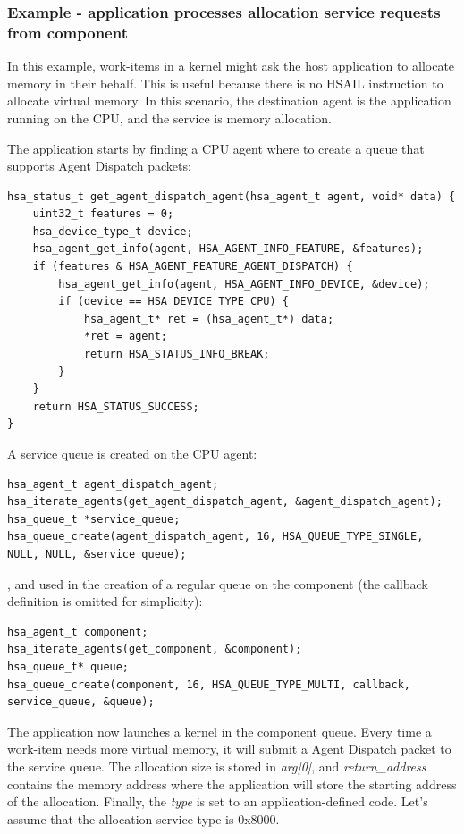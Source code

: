 \documentclass[final]{book}
\newcommand{\reffld}[1]{\textit{#1}}
\begin{document}
\subsubsection{Example - application processes allocation service requests from
  component}
In this example, work-items in a kernel might ask the host application to
allocate memory in their behalf. This is useful because there is no HSAIL
instruction to allocate virtual memory. In this scenario, the destination agent
is the application running on the CPU, and the service is memory allocation.

The application starts by finding a CPU agent where to create a queue that
supports Agent Dispatch packets:
\begin{lstlisting}
hsa_status_t get_agent_dispatch_agent(hsa_agent_t agent, void* data) {
    uint32_t features = 0;
    hsa_device_type_t device;
    hsa_agent_get_info(agent, HSA_AGENT_INFO_FEATURE, &features);
    if (features & HSA_AGENT_FEATURE_AGENT_DISPATCH) {
        hsa_agent_get_info(agent, HSA_AGENT_INFO_DEVICE, &device);
        if (device == HSA_DEVICE_TYPE_CPU) {
            hsa_agent_t* ret = (hsa_agent_t*) data;
            *ret = agent;
            return HSA_STATUS_INFO_BREAK;
        }
    }
    return HSA_STATUS_SUCCESS;
}
\end{lstlisting}
A service queue is created on the CPU agent:
\begin{lstlisting}
hsa_agent_t agent_dispatch_agent;
hsa_iterate_agents(get_agent_dispatch_agent, &agent_dispatch_agent);
hsa_queue_t *service_queue;
hsa_queue_create(agent_dispatch_agent, 16, HSA_QUEUE_TYPE_SINGLE, NULL, NULL, &service_queue);
\end{lstlisting}
, and used in the creation of a regular queue on the component (the
callback definition is omitted for simplicity):
\begin{lstlisting}
hsa_agent_t component;
hsa_iterate_agents(get_component, &component);
hsa_queue_t* queue;
hsa_queue_create(component, 16, HSA_QUEUE_TYPE_MULTI, callback, service_queue, &queue);
\end{lstlisting}
The application now launches a kernel in the component queue. Every time a
work-item needs more virtual memory, it will submit a Agent Dispatch packet to
the service queue. The allocation size is stored in \reffld{arg[0]}, and
\reffld{return_address} contains the memory address where the application will
store the starting address of the allocation. Finally, the \reffld{type} is set
to an application-defined code. Let's assume that the allocation service type is
0x8000.
\end{document}
